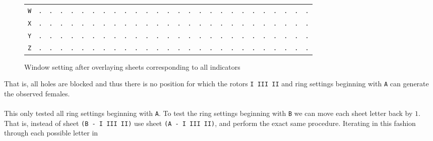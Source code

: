 \begin{figure}[H]
\begin{center}
{\begin{tabular}{c|cccccccccccccccccccccccccc}
				\texttt{W} & \texttt{.} & \texttt{.} & \texttt{.} &
				\texttt{.} & \texttt{.} & \texttt{.} & \texttt{.} &
				\texttt{.} & \texttt{.} & \texttt{.} & \texttt{.} &
				\texttt{.} & \texttt{.} & \texttt{.} & \texttt{.} &
				\texttt{.} & \texttt{.} & \texttt{.} & \texttt{.} &
				\texttt{.} & \texttt{.} & \texttt{.} & \texttt{.} &
				\texttt{.} & \texttt{.} & \texttt{.}                             \\
				\texttt{X} & \texttt{.} & \texttt{.} & \texttt{.} &
				\texttt{.} & \texttt{.} & \texttt{.} & \texttt{.} &
				\texttt{.} & \texttt{.} & \texttt{.} & \texttt{.} &
				\texttt{.} & \texttt{.} & \texttt{.} & \texttt{.} &
				\texttt{.} & \texttt{.} & \texttt{.} & \texttt{.} &
				\texttt{.} & \texttt{.} & \texttt{.} & \texttt{.} &
				\texttt{.} & \texttt{.} & \texttt{.}                             \\
				\texttt{Y} & \texttt{.} & \texttt{.} & \texttt{.} &
				\texttt{.} & \texttt{.} & \texttt{.} & \texttt{.} &
				\texttt{.} & \texttt{.} & \texttt{.} & \texttt{.} &
				\texttt{.} & \texttt{.} & \texttt{.} & \texttt{.} &
				\texttt{.} & \texttt{.} & \texttt{.} & \texttt{.} &
				\texttt{.} & \texttt{.} & \texttt{.} & \texttt{.} &
				\texttt{.} & \texttt{.} & \texttt{.}                             \\
				\texttt{Z} & \texttt{.} & \texttt{.} & \texttt{.} &
				\texttt{.} & \texttt{.} & \texttt{.} & \texttt{.} &
				\texttt{.} & \texttt{.} & \texttt{.} & \texttt{.} &
				\texttt{.} & \texttt{.} & \texttt{.} & \texttt{.} &
				\texttt{.} & \texttt{.} & \texttt{.} & \texttt{.} &
				\texttt{.} & \texttt{.} & \texttt{.} & \texttt{.} &
				\texttt{.} & \texttt{.} & \texttt{.}                             \\
			\end{tabular}
		}
	\end{center}
	\caption{Window setting after overlaying sheets corresponding to
		all indicators}
\end{figure}
\noindent That is, all holes are blocked and thus there is no
position for which the rotors \texttt{I III II} and ring settings
beginning with \texttt{A} can generate the observed females.
\\\\This only tested all ring settings beginning with \texttt{A}. To
test the ring settings beginning with \texttt{B} we can move each
sheet letter back by $1$. That is, instead of sheet \texttt{(B - I
	III II)} use sheet \texttt{(A - I III II)}, and perform the exact same
procedure. Iterating in this fashion through each possible letter in

